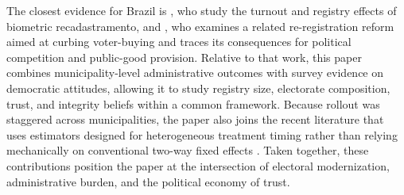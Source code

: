 The closest evidence for Brazil is \citet{forquesatoRodrigues2023}, who study the turnout and registry effects of biometric recadastramento, and \citet{Karim2025VoterBuyingPolitici}, who examines a related re-registration reform aimed at curbing voter-buying and traces its consequences for political competition and public-good provision. Relative to that work, this paper combines municipality-level administrative outcomes with survey evidence on democratic attitudes, allowing it to study registry size, electorate composition, trust, and integrity beliefs within a common framework. Because rollout was staggered across municipalities, the paper also joins the recent literature that uses estimators designed for heterogeneous treatment timing rather than relying mechanically on conventional two-way fixed effects \citep{Callaway2020DifferenDifferenWith, Borusyak2024RevisitiEventStudy, deChaisemartin2020TwoWayFixed, GoodmanBacon2018DifferenDifferenWith}. Taken together, these contributions position the paper at the intersection of electoral modernization, administrative burden, and the political economy of trust.
